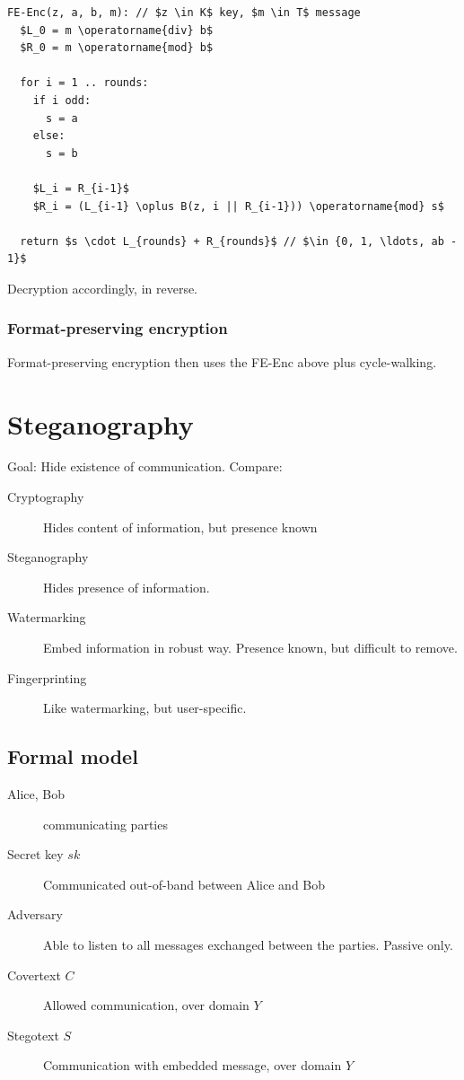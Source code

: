 \documentclass[a4paper]{scrreprt}
\begin{document}
\begin{lstlisting}[mathescape=true]
FE-Enc(z, a, b, m): // $z \in K$ key, $m \in T$ message
  $L_0 = m \operatorname{div} b$
  $R_0 = m \operatorname{mod} b$
  
  for i = 1 .. rounds:
    if i odd:
	  s = a
    else:
	  s = b
    
	$L_i = R_{i-1}$
	$R_i = (L_{i-1} \oplus B(z, i || R_{i-1})) \operatorname{mod} s$

  return $s \cdot L_{rounds} + R_{rounds}$ // $\in {0, 1, \ldots, ab - 1}$
\end{lstlisting}

Decryption accordingly, in reverse.

\subsection{Format-preserving encryption}

Format-preserving encryption then uses the FE-Enc above plus cycle-walking.

\chapter{Steganography}

Goal: Hide existence of communication. Compare:

\begin{description}
		\item[Cryptography] Hides content of information, but presence known
		\item[Steganography] Hides presence of information.
		\item[Watermarking] Embed information in robust way. Presence known,
				but difficult to remove.
		\item[Fingerprinting] Like watermarking, but user-specific.
\end{description}

\section{Formal model}

\begin{description}
		\item[Alice, Bob] communicating parties
		\item[Secret key $sk$] Communicated out-of-band between Alice and Bob
		\item[Adversary] Able to listen to all messages exchanged between the
				parties. Passive only.
		\item[Covertext $C$] Allowed communication, over domain $Y$
		\item[Stegotext $S$] Communication with embedded message, over domain $Y$
\end{description}
\end{document}
